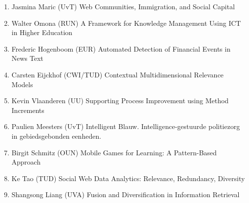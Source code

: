 \begin{multicols}{2}
\begin{scriptsize}
\begin{enumerate}[leftmargin=*,noitemsep,topsep=0pt,parsep=1pt,partopsep=0pt]
\item Jasmina Maric (UvT) Web Communities, Immigration, and Social Capital
\item Walter Omona (RUN) A Framework for Knowledge Management Using ICT in Higher Education
\item Frederic Hogenboom (EUR) Automated Detection of Financial Events in News Text
\item Carsten Eijckhof (CWI/TUD) Contextual Multidimensional Relevance Models
\item Kevin Vlaanderen (UU) Supporting Process Improvement using Method Increments 
\item Paulien Meesters (UvT) Intelligent Blauw. Intelligence-gestuurde politiezorg in gebiedsgebonden eenheden.
\item Birgit Schmitz (OUN) Mobile Games for Learning: A Pattern-Based Approach 
\item Ke Tao (TUD) Social Web Data Analytics: Relevance, Redundancy, Diversity
\item Shangsong Liang (UVA) Fusion and Diversification in Information Retrieval
\end{enumerate}


\end{scriptsize}
\end{multicols}
